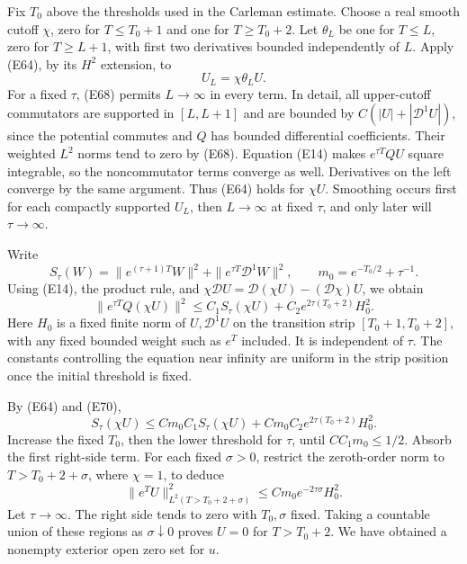 \documentclass[
  11pt,
]{article}
\begin{document}
Fix \(T_0\) above the thresholds used in the Carleman estimate. Choose a
real smooth cutoff \(\chi\), zero for \(T\leq T_0+1\) and one for
\(T\geq T_0+2\). Let \(\theta_L\) be one for \(T\leq L\), zero for
\(T\geq L+1\), with first two derivatives bounded independently of
\(L\). Apply (E64), by its \(H^2\) extension, to \[
                            U_L=\chi\theta_LU.                  \tag{E69}
\] For a fixed \(\tau\), (E68) permits \(L\to\infty\) in every term. In
detail, all upper-cutoff commutators are supported in \([L,L+1]\) and
are bounded by \(C(|U|+|\mathcal D^1U|)\), since the potential commutes
and \(Q\) has bounded differential coefficients. Their weighted \(L^2\)
norms tend to zero by (E68). Equation (E14) makes \(e^{\tau T}QU\)
square integrable, so the noncommutator terms converge as well.
Derivatives on the left converge by the same argument. Thus (E64) holds
for \(\chi U\). Smoothing occurs first for each compactly supported
\(U_L\), then \(L\to\infty\) at fixed \(\tau\), and only later will
\(\tau\to\infty\).

Write \[
 S_\tau(W)=\|e^{(\tau+1)T}W\|^2
            +\|e^{\tau T}\mathcal D^1W\|^2,\qquad
                      m_0=e^{-T_0/2}+\tau^{-1}.
\] Using (E14), the product rule, and
\(\chi\mathcal D U=\mathcal D(\chi U)-(\mathcal D\chi)U\), we obtain \[
 \|e^{\tau T}Q(\chi U)\|^2
           \leq C_1 S_\tau(\chi U)+C_2e^{2\tau(T_0+2)}H_0^2.   \tag{E70}
\] Here \(H_0\) is a fixed finite norm of \(U,\mathcal D^1U\) on the
transition strip \([T_0+1,T_0+2]\), with any fixed bounded weight such
as \(e^T\) included. It is independent of \(\tau\). The constants
controlling the equation near infinity are uniform in the strip position
once the initial threshold is fixed.

By (E64) and (E70), \[
 S_\tau(\chi U)\leq C m_0 C_1 S_\tau(\chi U)
                      +C m_0 C_2e^{2\tau(T_0+2)}H_0^2.
\] Increase the fixed \(T_0\), then the lower threshold for \(\tau\),
until \(CC_1m_0\leq1/2\). Absorb the first right-side term. For each
fixed \(\sigma>0\), restrict the zeroth-order norm to
\(T>T_0+2+\sigma\), where \(\chi=1\), to deduce \[
 \|e^TU\|_{L^2(T>T_0+2+\sigma)}^2
                   \leq C m_0e^{-2\tau\sigma}H_0^2.             \tag{E71}
\] Let \(\tau\to\infty\). The right side tends to zero with
\(T_0,\sigma\) fixed. Taking a countable union of these regions as
\(\sigma\downarrow0\) proves \(U=0\) for \(T>T_0+2\). We have obtained a
nonempty exterior open zero set for \(u\).
\end{document}
